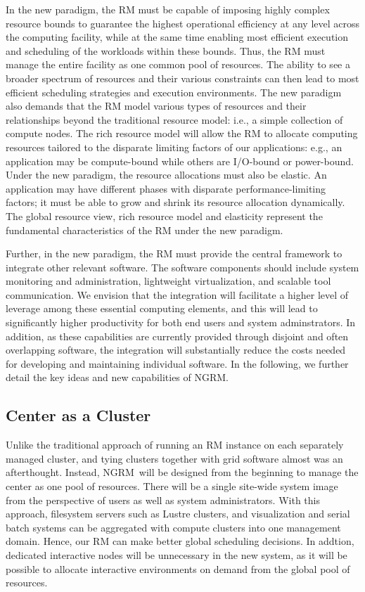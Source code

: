 \documentclass{article}
\newcommand{\ngrm}{NGRM}
\begin{document}
In the new paradigm, the RM must be capable of imposing highly complex resource bounds
to guarantee the highest operational efficiency at any level
across the computing facility, while at the same time enabling most efficient execution
and scheduling of the workloads within these bounds.
Thus, the RM must manage the entire facility as one
common pool of resources. The ability to see a broader spectrum of resources 
and their various constraints can then lead to most efficient scheduling strategies
and execution environments. The new paradigm also demands that the RM model
various types of resources and their relationships beyond the traditional resource model:
i.e., a simple collection of compute nodes.
The rich resource model will allow the RM to allocate computing resources
tailored to the disparate limiting factors of our applications: e.g.,
an application may be compute-bound while others are I/O-bound or power-bound.
Under the new paradigm, the resource allocations must also be elastic. 
An application may have different phases with disparate performance-limiting factors;
it must be able to grow and shrink its resource allocation dynamically. 
The global resource view, rich resource model and elasticity represent
the fundamental characteristics of the RM under the new paradigm.

Further, in the new paradigm, the RM must provide the central framework to integrate
other relevant software. The software components should include   
system monitoring and administration, lightweight virtualization, 
and scalable tool communication. We envision that the integration will 
facilitate a higher level of leverage among these essential computing elements, 
and this will lead to significantly higher productivity 
for both end users and system adminstrators.  
In addition, as these capabilities are currently provided through disjoint
and often overlapping software, the integration will substantially reduce
the costs needed for developing and maintaining individual software.  
In the following, we further detail the key ideas and new capabilities of \ngrm.


\subsection{Center as a Cluster}

Unlike the traditional approach of running an RM instance on each separately
managed cluster, and tying clusters together with grid software almost was
an afterthought. Instead, \ngrm\ will be designed from the beginning to manage the
center as one pool of resources. There will be a single site-wide 
system image from the perspective of users as well as system administrators.
With this approach, filesystem servers such as Lustre clusters, 
and visualization and serial batch systems can be aggregated
with compute clusters into one management domain. Hence,
our RM can make better global scheduling decisions. 
In addtion, dedicated interactive nodes will be unnecessary in the new system, as it
will be possible to allocate interactive environments on demand from the
global pool of resources.
\end{document}
